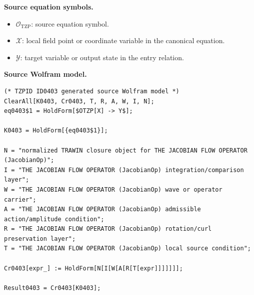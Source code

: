 \begin{minipage}[t]{0.49\linewidth}
\begingroup
\small
\raggedright
\textbf{Source equation symbols.}\par
\begin{itemize}[leftmargin=1.35em,itemsep=1pt,topsep=1pt,parsep=0pt]
    \item $\mathcal{O}_{\mathrm{TZP}}$: source equation symbol.
    \item $\mathcal{X}$: local field point or coordinate variable in the canonical equation.
    \item $\mathcal{Y}$: target variable or output state in the entry relation.
\end{itemize}
\endgroup
\end{minipage}\hfill
\begin{minipage}[t]{0.47\linewidth}
\begingroup
\scriptsize
\raggedright
\textbf{Source Wolfram model.}\par
\begin{Verbatim}[fontsize=\tiny,breaklines=true,breakanywhere=true]
(* TZPID ID0403 generated source Wolfram model *)
ClearAll[K0403, Cr0403, T, R, A, W, I, N];
eq0403$1 = HoldForm[$OTZP[X] -> Y$];

K0403 = HoldForm[{eq0403$1}];

N = "normalized TRAWIN closure object for THE JACOBIAN FLOW OPERATOR (JacobianOp)";
I = "THE JACOBIAN FLOW OPERATOR (JacobianOp) integration/comparison layer";
W = "THE JACOBIAN FLOW OPERATOR (JacobianOp) wave or operator carrier";
A = "THE JACOBIAN FLOW OPERATOR (JacobianOp) admissible action/amplitude condition";
R = "THE JACOBIAN FLOW OPERATOR (JacobianOp) rotation/curl preservation layer";
T = "THE JACOBIAN FLOW OPERATOR (JacobianOp) local source condition";

Cr0403[expr_] := HoldForm[N[I[W[A[R[T[expr]]]]]]];

Result0403 = Cr0403[K0403];
\end{Verbatim}
\endgroup
\end{minipage}

